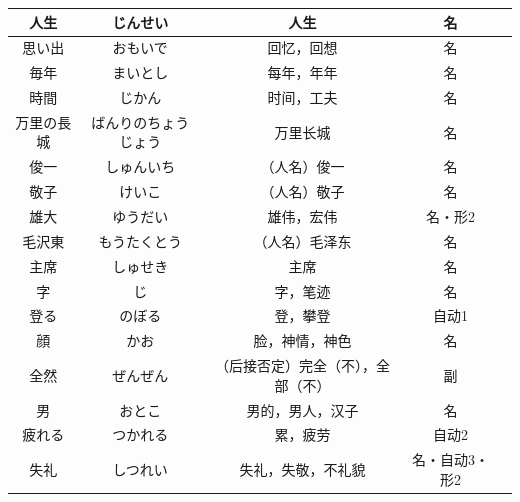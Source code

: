 \begin{longtable}{|c|c|c|c|c|}
人生 & じんせい & 人生 & 名 & \\ \hline
思い出 & おもいで & 回忆，回想 & 名 & \\ \hline
毎年 & まいとし & 每年，年年 & 名 & \\ \hline
時間 & じかん & 时间，工夫 & 名 & \\ \hline
万里の長城 & ばんりのちょうじょう & 万里长城 & 名 & \\ \hline
俊一 & しゅんいち & （人名）俊一 & 名 & \\ \hline
敬子 & けいこ & （人名）敬子 & 名 & \\ \hline
雄大 & ゆうだい & 雄伟，宏伟 & 名・形2 & \\ \hline
毛沢東 & もうたくとう & （人名）毛泽东 & 名 & \\ \hline
主席 & しゅせき & 主席 & 名 & \\ \hline
字 & じ & 字，笔迹 & 名 & \\ \hline
登る & のぼる & 登，攀登 & 自动1 & \\ \hline
顔 & かお & 脸，神情，神色 & 名 & \\ \hline
全然 & ぜんぜん & （后接否定）完全（不），全部（不） & 副 & \\ \hline
男 & おとこ & 男的，男人，汉子 & 名 & \\ \hline
疲れる & つかれる & 累，疲劳 & 自动2 & \\ \hline
失礼 & しつれい & 失礼，失敬，不礼貌 & 名・自动3・形2 & \\ \hline
\end{longtable}

